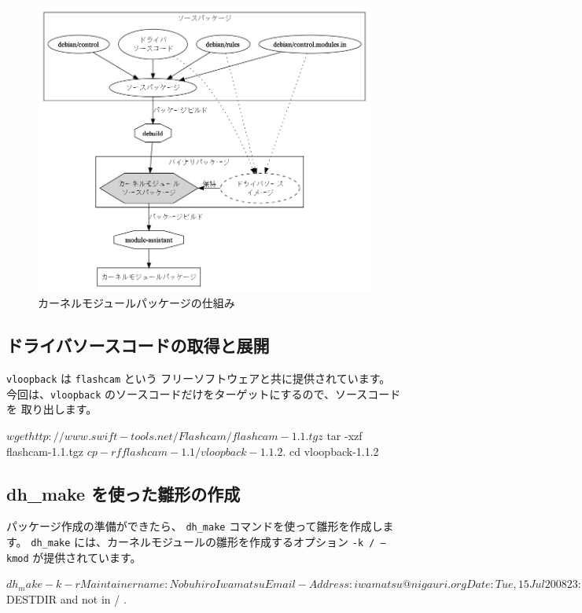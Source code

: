 \documentclass[mingoth,a4paper]{jsarticle}
\begin{document}
\begin{figure}[h]
 \begin{center}
  \includegraphics[width=0.8\hsize]{image200807/kmod0.png}
 \end{center}
 \caption{カーネルモジュールパッケージの仕組み}
 \label{fig:mod0}
\end{figure}

\subsection{ドライバソースコードの取得と展開}
\texttt{vloopback} は \texttt{flashcam} という フリーソフトウェアと共に提供されています。
今回は、\texttt{vloopback} のソースコードだけをターゲットにするので、ソースコードを
取り出します。
\begin{commandline}
$ wget http://www.swift-tools.net/Flashcam/flashcam-1.1.tgz
$ tar -xzf flashcam-1.1.tgz
$ cp -rf flashcam-1.1/vloopback-1.1.2 .
$ cd vloopback-1.1.2
\end{commandline}

\subsection{dh\_make を使った雛形の作成}
パッケージ作成の準備ができたら、 \texttt{dh\_make} コマンドを使って雛形を作成します。
\texttt{dh\_make} には、カーネルモジュールの雛形を作成するオプション \texttt{-k / --kmod} が提供されています。

\begin{commandline}
$ dh_make -k -r 
Maintainer name : Nobuhiro Iwamatsu
Email-Address   : iwamatsu@nigauri.org 
Date            : Tue, 15 Jul 2008 23:21:23 +0900
Package Name    : vloopback
Version         : 1.1.2
License         : blank
Using dpatch    : no
Type of Package : Kernel Module
Hit <enter> to confirm: 
Done. Please edit the files in the debian/ subdirectory now. You should also
check that the vloopback Makefiles install into $DESTDIR and not in / .
\end{commandline}
\end{document}
